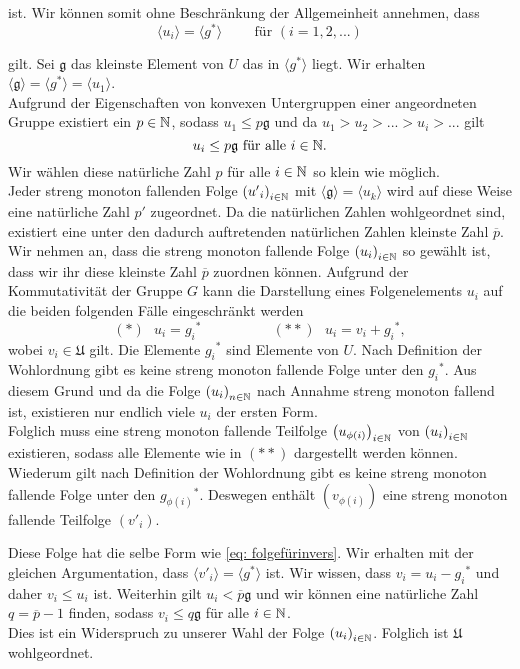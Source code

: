{ist.
Wir können somit ohne Beschränkung der Allgemeinheit annehmen, dass
\[\langle u_i \rangle = \langle g^*\rangle ~~~~~~~~~\text{ für }\left(i = 1, 2,...\right)\]

gilt.
%
Sei $\mathfrak{g}$ das kleinste Element von $U$ das in $\langle g^*\rangle$ liegt. Wir erhalten $\langle \mathfrak{g}\rangle = \langle g^*\rangle = \langle u_1 \rangle$.\\
%
%
Aufgrund der Eigenschaften von konvexen Untergruppen einer angeordneten Gruppe existiert ein $p \in \mathbb{N}$, sodass $u_1 \le p\mathfrak{g}$ und da $u_1 > u_2 > ... > u_i > ...$ gilt 
\[u_i \le p\mathfrak{g}\text{ für alle }i \in \mathbb{N}.\] 
%
%
Wir wählen diese natürliche Zahl $p$ für alle $i\in\mathbb{N}$ so klein wie möglich. \\
%
%
Jeder streng monoton fallenden Folge $\left({u'}_i\right)_{i\in\mathbb{N}}$ mit $\langle \mathfrak{g}\rangle = \langle u_k \rangle$ %
wird auf diese Weise eine natürliche Zahl $p'$ zugeordnet. Da die natürlichen Zahlen wohlgeordnet sind, existiert eine unter den dadurch auftretenden natürlichen Zahlen kleinste Zahl $\overline{p}$. Wir nehmen an, dass die streng monoton fallende Folge $\left(u_i\right)_{i\in\mathbb{N}}$ so gewählt ist, dass wir ihr diese kleinste Zahl $\overline{p}$ zuordnen können.
%
%
%
%
Aufgrund der Kommutativität der Gruppe $G$ kann die Darstellung eines Folgenelements $u_i$ auf die beiden folgenden Fälle eingeschränkt werden
%
\[
(*)~~~ u_i = {g_i}^* ~~~~~~~~~~~~~~~~~~~~~~~   (**)~~~    u_i = v_i+{g_i}^*,
\]
%
%
%
wobei $v_i \in \mathfrak{U}$ gilt. 
Die Elemente ${g_i}^*$ sind Elemente von $U$. Nach Definition der Wohlordnung gibt es keine streng monoton fallende Folge unter den ${g_i}^*$. Aus diesem Grund und da die Folge ${\left(u_i\right)}_{n\in \mathbb{N}}$ nach Annahme streng monoton fallend ist, existieren nur endlich viele $u_i$ der ersten Form. \\
%
%
%
%

%
%
%
Folglich muss eine streng monoton fallende Teilfolge $\left(u_{\phi(i)}\right)_{i\in\mathbb{N}}$ von $\left(u_i\right)_{i\in\mathbb{N}}$ existieren, sodass alle Elemente wie in $(**)$ dargestellt werden können. Wiederum gilt nach Definition der Wohlordnung gibt es keine streng monoton fallende Folge unter den ${g_{\phi(i)}}^*$. Deswegen enthält $\left({v_{\phi(i)}}\right)$ eine streng monoton fallende Teilfolge $\left({{v'}_{i}}\right) $.

Diese Folge hat die selbe Form wie \ref{eq: folgefürinvers}. Wir erhalten mit der gleichen Argumentation, dass $\langle {v'}_i\rangle = \langle g^*\rangle$ ist.
%
%
%
%
%
Wir wissen, dass $v_i = u_i - {g_i}^*$ und daher ${v}_i \le u_i$ ist. Weiterhin gilt $u_i < \overline{p}\mathfrak{g}$ und wir können eine natürliche Zahl $q = \overline{p}-1$ finden, sodass $v_i \le q\mathfrak{g}$ für alle $i \in \mathbb{N}$.\\
Dies ist ein Widerspruch zu unserer Wahl der Folge ${\left(u_i\right)}_{i\in\mathbb{N}}$. Folglich ist $\mathfrak{U}$ wohlgeordnet.
%
%
%
%
%

%
%
%
%

}
